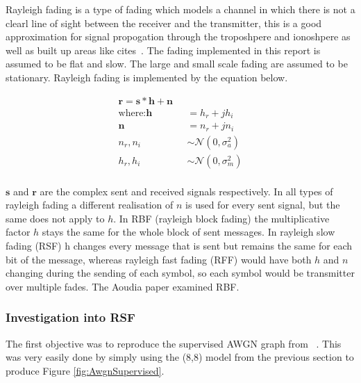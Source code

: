 \documentclass[12pt,onecolumn,letterpaper]{article}
\begin{document}
Rayleigh fading is a type of fading which models a channel in which there is not a clearl line of sight between the receiver and the transmitter, this is a good approximation for signal propogation through the troposhpere and ionoshpere as well as built up areas like cites~\cite{RayleighProakis}. The fading implemented in this report is assumed to be flat and slow. The large and small scale fading are assumed to be stationary. Rayleigh fading is implemented by the equation below.

\begin{align}
   \mathbf{r} = \mathbf{s}*\mathbf{h} + \mathbf{n} \mbox{ }&\nonumber\\
   \mbox{where:}\mathbf{h} &= h_r + jh_i \nonumber\\
   \mathbf{n} &= n_r + jn_i \nonumber\\
   n_r,n_i &\sim \mathcal{N}(0,\sigma_a^2) \nonumber\\
   h_r,h_i &\sim \mathcal{N}(0,\sigma_m^2) \nonumber\\
   \label{eq:RaylieghDef}
\end{align}

$\mathbf{s}$ and $\mathbf{r}$ are the complex sent and received signals respectively. In all types of rayleigh fading a different realisation of $n$ is used for every sent signal, but the same does not apply to $h$. In RBF (rayleigh block fading) the multiplicative factor $h$ stays the same for the whole block of sent messages. In rayleigh slow fading (RSF) h changes every message that is sent but remains the same for each bit of the message, whereas rayleigh fast fading (RFF) would have both $h$ and $n$ changing during the sending of each symbol, so each symbol would be transmitter over multiple fades. The Aoudia paper examined RBF.



\subsubsection{Investigation into RSF}

The first objective was to reproduce the supervised AWGN graph from ~\cite{Aoudia}. This was very easily done by simply using the (8,8) model from the previous section to produce Figure \ref{fig:AwgnSupervised}.
\end{document}
